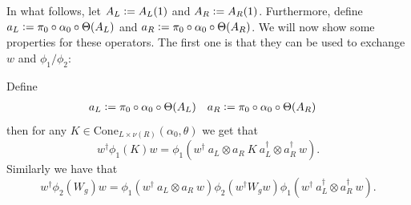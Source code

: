 \documentclass[12pt,a4paper,twoside]{article}
\numberwithin{equation}{section}
\begin{document}
In what follows, let $A_L\vcentcolon= A_L(1)$ and $A_R\vcentcolon= A_R(1)$. Furthermore, define $a_L\vcentcolon= \pi_0\circ\alpha_0\circ\Theta(A_L)$ and $a_R\vcentcolon= \pi_0\circ\alpha_0\circ\Theta(A_R)$. We will now show some properties for these operators. The first one is that they can be used to exchange $w$ and $\phi_1/\phi_2$:
\begin{lemma}
	Define
	\begin{align}
		a_L&\vcentcolon= \pi_0\circ\alpha_0\circ\Theta(A_L)&a_R&\vcentcolon= \pi_0\circ\alpha_0\circ\Theta(A_R)
	\end{align}
	then for any $K\in\text{Cone}_{L\times\nu(R)}(\alpha_0,\theta)$ we get that
	\begin{equation}\label{eq:TranslationOutOfPhi_K}
		w^\dagger \phi_1(K)w=\phi_1(w^\dagger \: a_L\otimes a_R \: K \: a_L^\dagger\otimes a_R^\dagger \: w).
	\end{equation}
	Similarly we have that
	\begin{equation}\label{eq:TranslationOutOfPhi_W}
		w^\dagger \phi_2(W_g)w=\phi_1(w^\dagger \: a_L\otimes a_R \: w)\phi_2(w^\dagger W_g w)\phi_1(w^\dagger \: a_L^\dagger\otimes a_R^\dagger \: w).
	\end{equation}
\end{lemma}
\end{document}

